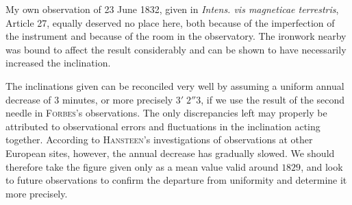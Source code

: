 My own observation of 23 June 1832, given in \textit{Intens. vis magneticae terrestris}, Article 27, equally deserved no place here, both because of the imperfection of the instrument and because of the room in the observatory. The ironwork nearby was bound to affect the result considerably and can be shown to have necessarily increased the inclination.

The inclinations given can be reconciled very well by assuming a uniform annual decrease of $3$ minutes, or more precisely $3'\;2''3$, if we use the result of the second needle in \textsc{Forbes}'s observations. The only discrepancies left may properly be attributed to observational errors and fluctuations in the inclination acting together. According to \textsc{Hansteen}'s investigations of observations at other European sites, however, the annual decrease has gradually slowed. We should therefore take the figure given only as a mean value valid around $1829$, and look to future observations to confirm the departure from uniformity and determine it more precisely.


\par\endgroup
